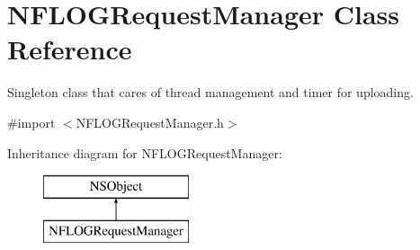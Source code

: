 \hypertarget{interface_n_f_l_o_g_request_manager}{}\section{N\+F\+L\+O\+G\+Request\+Manager Class Reference}
\label{interface_n_f_l_o_g_request_manager}


Singleton class that cares of thread management and timer for uploading.  




{\ttfamily \#import $<$N\+F\+L\+O\+G\+Request\+Manager.\+h$>$}

Inheritance diagram for N\+F\+L\+O\+G\+Request\+Manager\+:\begin{figure}[H]
\begin{center}
\leavevmode
\includegraphics[height=2.000000cm]{interface_n_f_l_o_g_request_manager}
\end{center}
\end{figure}
